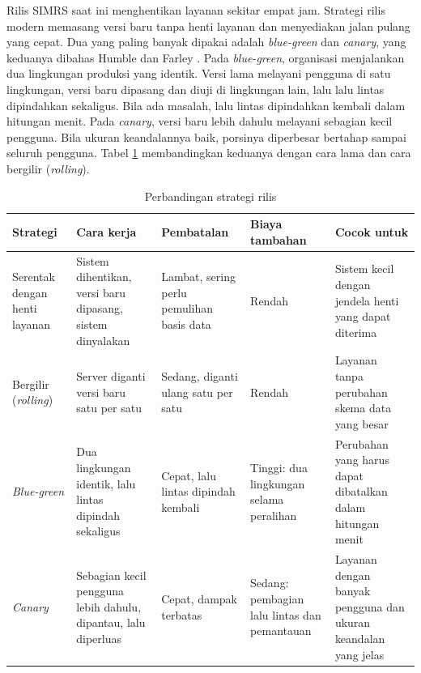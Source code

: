 Rilis SIMRS saat ini menghentikan layanan sekitar empat jam. Strategi rilis modern memasang versi
baru tanpa henti layanan dan menyediakan jalan pulang yang cepat. Dua yang paling banyak dipakai
adalah \textit{blue-green} dan \textit{canary}, yang keduanya dibahas Humble dan Farley
\cite{c13-humble2010}. Pada \textit{blue-green}, organisasi menjalankan dua lingkungan produksi
yang identik. Versi lama melayani pengguna di satu lingkungan, versi baru dipasang dan diuji di
lingkungan lain, lalu lalu lintas dipindahkan sekaligus. Bila ada masalah, lalu lintas dipindahkan
kembali dalam hitungan menit. Pada \textit{canary}, versi baru lebih dahulu melayani sebagian kecil
pengguna. Bila ukuran keandalannya baik, porsinya diperbesar bertahap sampai seluruh pengguna.
Tabel \ref{tab:ch13-strategi-rilis} membandingkan keduanya dengan cara lama dan cara bergilir
(\textit{rolling}).

\begin{table}[!htb]
  \centering
  \caption{Perbandingan strategi rilis}
  \label{tab:ch13-strategi-rilis}
  \footnotesize
  \begin{tabularx}{\textwidth}{>{\raggedright\arraybackslash}p{2.0cm} >{\raggedright\arraybackslash}X >{\raggedright\arraybackslash}p{2.1cm} >{\raggedright\arraybackslash}p{2.3cm} >{\raggedright\arraybackslash}X}
    \hline
    \textbf{Strategi} & \textbf{Cara kerja} & \textbf{Pembatalan} & \textbf{Biaya tambahan} &
      \textbf{Cocok untuk} \\ \hline
    Serentak dengan henti layanan & Sistem dihentikan, versi baru dipasang, sistem dinyalakan &
      Lambat, sering perlu pemulihan basis data & Rendah & Sistem kecil dengan jendela henti yang
      dapat diterima \\ \hline
    Bergilir (\textit{rolling}) & Server diganti versi baru satu per satu & Sedang, diganti
      ulang satu per satu & Rendah & Layanan tanpa perubahan skema data yang besar \\ \hline
    \textit{Blue-green} & Dua lingkungan identik, lalu lintas dipindah sekaligus & Cepat,
      lalu lintas dipindah kembali & Tinggi: dua lingkungan selama peralihan & Perubahan yang
      harus dapat dibatalkan dalam hitungan menit \\ \hline
    \textit{Canary} & Sebagian kecil pengguna lebih dahulu, dipantau, lalu diperluas & Cepat,
      dampak terbatas & Sedang: pembagian lalu lintas dan pemantauan & Layanan dengan banyak
      pengguna dan ukuran keandalan yang jelas \\ \hline
  \end{tabularx}
\end{table}

